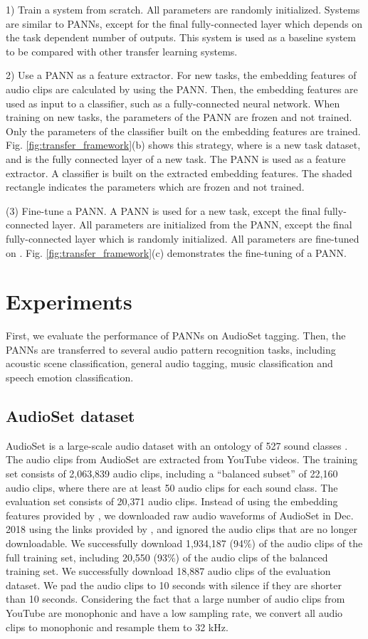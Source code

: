 \documentclass[journal]{IEEEtran}
\begin{document}
1) Train a system from scratch. All parameters are randomly initialized. Systems are similar to PANNs, except for the final fully-connected layer which depends on the task dependent number of outputs. This system is used as a baseline system to be compared with other transfer learning systems. 

2) Use a PANN as a feature extractor. For new tasks, the embedding features of audio clips are calculated by using the PANN. Then, the embedding features are used as input to a classifier, such as a fully-connected neural network. When training on new tasks, the parameters of the PANN are frozen and not trained. Only the parameters of the classifier built on the embedding features are trained. Fig. \ref{fig:transfer_framework}(b) shows this strategy, where  is a new task dataset, and  is the fully connected layer of a new task. The PANN is used as a feature extractor. A classifier is built on the extracted embedding features. The shaded rectangle indicates the parameters which are frozen and not trained.

(3) Fine-tune a PANN. A PANN is used for a new task, except the final fully-connected layer. All parameters are initialized from the PANN, except the final fully-connected layer which is randomly initialized. All parameters are fine-tuned on . Fig. \ref{fig:transfer_framework}(c) demonstrates the fine-tuning of a PANN. 


\section{Experiments}\label{section:experiments}

First, we evaluate the performance of PANNs on AudioSet tagging. Then, the PANNs are transferred to several audio pattern recognition tasks, including acoustic scene classification, general audio tagging, music classification and speech emotion classification. 

\subsection{AudioSet dataset}
AudioSet is a large-scale audio dataset with an ontology of 527 sound classes \cite{gemmeke2017audio}. The audio clips from AudioSet are extracted from YouTube videos. The training set consists of 2,063,839 audio clips, including a ``balanced subset'' of 22,160 audio clips, where there are at least 50 audio clips for each sound class. The evaluation set consists of 20,371 audio clips. Instead of using the embedding features provided by \cite{gemmeke2017audio}, we downloaded raw audio waveforms of AudioSet in Dec. 2018 using the links provided by \cite{gemmeke2017audio}, and ignored the audio clips that are no longer downloadable. We successfully download 1,934,187 (94\%) of the audio clips of the full training set, including 20,550 (93\%) of the audio clips of the balanced training set. We successfully download 18,887 audio clips of the evaluation dataset. We pad the audio clips to 10 seconds with silence if they are shorter than 10 seconds. Considering the fact that a large number of audio clips from YouTube are monophonic and have a low sampling rate, we convert all audio clips to monophonic and resample them to 32 kHz. 
\end{document}
